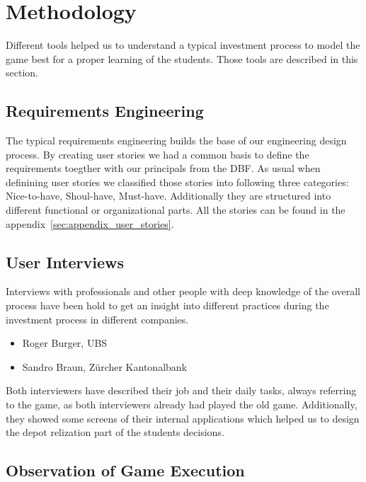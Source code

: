 \section{Methodology}
Different tools helped us to understand a typical investment process to model the game best for a proper learning of the students. Those tools are described in this section.

\subsection{Requirements Engineering}
The typical requirements engineering builds the base of our engineering design process. By creating user stories we had a common basis to define the requirements toegther with our principals from the DBF. As usual when definining user stories we classified those stories into following three categories: Nice-to-have, Shoul-have, Must-have. Additionally they are structured into different functional or organizational parts. All the stories can be found in the appendix~\ref{sec:appendix_user_stories}.

\subsection{User Interviews}
Interviews with professionals and other people with deep knowledge of the overall process have been hold to get an insight into different practices during the investment process in different companies.
\begin{itemize}
  \item Roger Burger, UBS
  \item Sandro Braun, Zürcher Kantonalbank
\end{itemize}

Both interviewers have described their job and their daily tasks, always referring to the game, as both interviewers already had played the old game. Additionally, they showed some screens of their internal applications which helped us to design the depot relization part of the students decisions.

\subsection{Observation of Game Execution}

